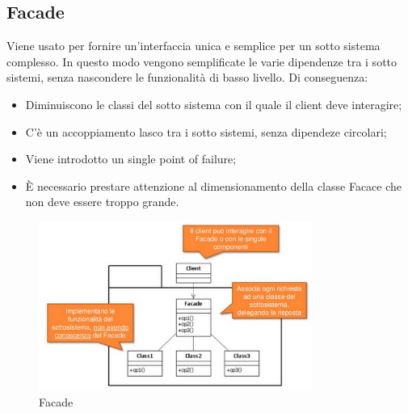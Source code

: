 \subsection{Facade}
Viene usato per fornire un’interfaccia unica e semplice per un sotto sistema complesso.
In questo modo vengono semplificate le varie dipendenze tra i sotto sistemi, senza nascondere le funzionalità di basso livello.
Di conseguenza:
\begin{itemize}
\item Diminuiscono le classi del sotto sistema con il quale il client deve interagire;
\item C’è un accoppiamento lasco tra i sotto sistemi, senza dipendeze circolari;
\item Viene introdotto un single point of failure;
\item \`{E} necessario prestare attenzione al dimensionamento della classe Facace che non deve essere troppo grande.
\end{itemize}
\begin{figure}[ht]
    \centering
    \includegraphics[width=0.8\textwidth]{immagini/facade.png}
    \caption{Facade}
\end{figure}
\FloatBarrier